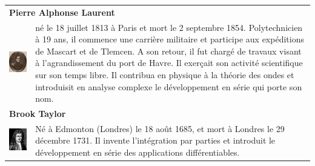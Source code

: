 \begin{tabular}{ll}
\multicolumn{2}{l}{\textbf{Pierre Alphonse Laurent}} \\[10pt]
\begin{minipage}{0.2\linewidth}
\includegraphics[scale=0.4]{images/Laurent.jpg}
\end{minipage}
&
\begin{minipage}{0.65\linewidth}
né le 18 juillet 1813 à Paris et mort le 2 septembre 1854. Polytechnicien à 19 ans, il commence une carrière militaire et participe aux expéditions de Mascart et de Tlemcen. A son retour, il fut chargé de travaux visant à l'agrandissement du port de Havre. Il exerçait son activité scientifique sur son temps libre. Il contribua en physique à la théorie des ondes et introduisit en analyse complexe le développement en série qui porte son nom. 
\end{minipage}\\
\multicolumn{2}{l}{\textbf{Brook Taylor}} \\[10pt]
\begin{minipage}{0.2\linewidth}
\includegraphics[scale=0.35]{images/Taylor.jpg}
\end{minipage}
&
\begin{minipage}{0.65\linewidth}
 Né à Edmonton (Londres) le 18 août 1685, et mort à Londres le 29 décembre 1731. Il invente l'intégration par parties et introduit le développement en série des applications différentiables. 
\end{minipage}
\end{tabular}
